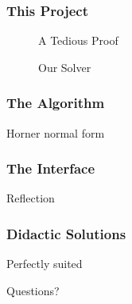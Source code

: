 \documentclass[usenames,dvipsnames]{beamer}
\begin{document}
\begin{frame}[fragile]
  \frametitle{This Project}
  \begin{figure}[t]
    \vspace{-10pt}
  \end{figure}

  \begin{minipage}[b]{0.5\textwidth}
    \begin{figure}[h!]
      \hspace*{-80pt}
      \caption{A Tedious Proof}
    \end{figure}%
  \end{minipage}%
  \begin{minipage}[b]{0.5\textwidth}
  \begin{figure}[h]
    \caption{Our Solver}
  \end{figure}
  \end{minipage}
\end{frame}
\begin{frame}
  \frametitle{The Algorithm}
  Horner normal form
\end{frame}
\begin{frame}
  \frametitle{The Interface}
  Reflection
\end{frame}
\begin{frame}
  \frametitle{Didactic Solutions}
  Perfectly suited
\end{frame}

\begin{frame}[standout]
  Questions?
\end{frame}
\end{document}
